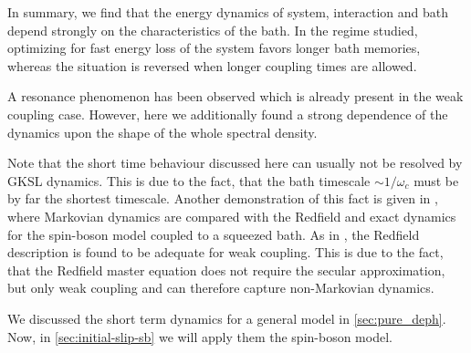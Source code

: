 In summary, we find that the energy dynamics of system, interaction and
bath depend strongly on the characteristics of the bath.  In the
regime studied, optimizing for fast energy loss of the system favors
longer bath memories, whereas the situation is reversed when longer
coupling times are allowed.

A resonance phenomenon has been observed which is already present in
the weak coupling case. However, here we additionally found a strong
dependence of the dynamics upon the shape of the whole spectral
density.

Note that the short time behaviour discussed here can usually not be
resolved by GKSL dynamics. This is due to the fact, that the bath
timescale \(\sim 1/ω_{c}\) must be by far the shortest
timescale. Another demonstration of this fact is given in
\cite{Link2022Feb}, where Markovian dynamics are compared with the
Redfield and exact dynamics for the spin-boson model coupled to a
squeezed bath. As in \cite{Xu2022Mar}, the Redfield description is
found to be adequate for weak coupling. This is due to the fact, that
the Redfield master equation does not require the secular
approximation, but only weak coupling and can therefore capture
non-Markovian dynamics.

We discussed the short term dynamics for a general model in
\cref{sec:pure_deph}.  Now, in \cref{sec:initial-slip-sb} we will
apply them the spin-boson model.

